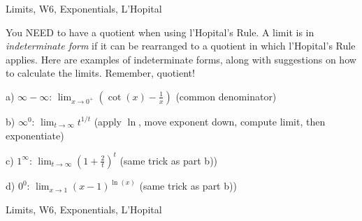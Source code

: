 \begin{tagblock}{Limits, W6, Exponentials, L'Hopital}
\begin{question}
	You NEED to have a quotient when using l'Hopital's Rule. A limit is in \textit{indeterminate form} if it can be rearranged to a quotient in which l'Hopital's Rule applies. Here are examples of indeterminate forms, along with suggestions on how to calculate the limits. Remember, quotient!

\bigskip

a) $\infty-\infty$: $\displaystyle\lim_{x\to 0^+}\left(\cot(x)-\frac 1 x\right)$ (common denominator)

\bigskip

b) $\infty^0$: $\displaystyle\lim_{t\to\infty}t^{1/t}$ (apply $\ln$, move exponent down, compute limit, then exponentiate)

\bigskip

c) $1^{\infty}$: $\displaystyle\lim_{t\to\infty}\left(1+\frac 2 t\right)^t$ (same trick as part b))

\bigskip

d) $0^0$: $\displaystyle\lim_{x\to 1}(x-1)^{\ln(x)}$ (same trick as part b))
	
	
\begin{tags}
	   Limits, W6, Exponentials, L'Hopital
\end{tags}
	
\begin{diary}
	    
\end{diary}
	
\begin{solution}
	  
\end{solution}
	
\end{question}

\end{tagblock}

